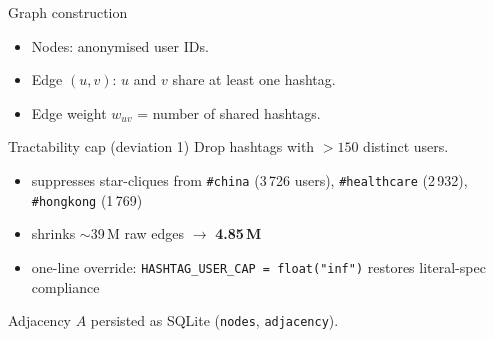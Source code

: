 \documentclass[aspectratio=169,10pt]{beamer}
\begin{document}
\begin{frame}{Graph construction}
  \begin{itemize}
    \item Nodes: anonymised user IDs.
    \item Edge \((u,v)\): \(u\) and \(v\) share at least one
          hashtag.
    \item Edge weight \(w_{uv}\) = number of shared
          hashtags.
  \end{itemize}
  \begin{block}{Tractability cap (deviation 1)}
    Drop hashtags with \(>\!150\) distinct users.
    \begin{itemize}
      \item suppresses star-cliques from \texttt{\#china}
            (3\,726 users), \texttt{\#healthcare} (2\,932),
            \texttt{\#hongkong} (1\,769)
      \item shrinks \(\sim\)39\,M raw edges \(\rightarrow\)
            \textbf{4.85\,M}
      \item one-line override: \texttt{HASHTAG\_USER\_CAP =
            float("inf")} restores literal-spec compliance
    \end{itemize}
  \end{block}
  Adjacency \(A\) persisted as SQLite (\texttt{nodes},
  \texttt{adjacency}).
\end{frame}
\end{document}
